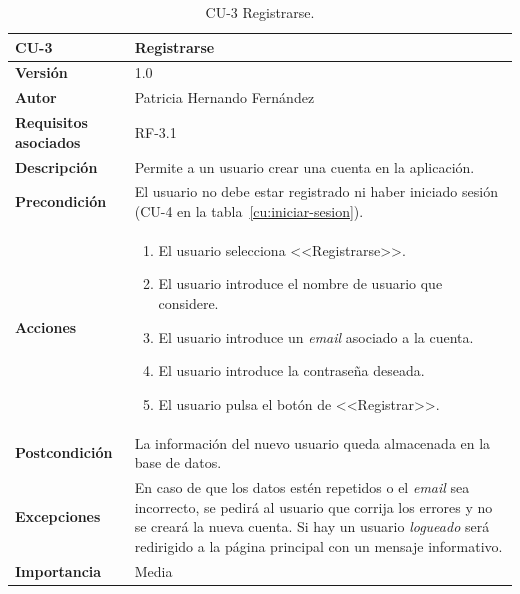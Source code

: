 \begin{table}[p]
	\centering
	\begin{tabularx}{\linewidth}{ p{} p{} }
		\toprule
		\textbf{CU-3}    & \textbf{Registrarse}\\
		\toprule
		\textbf{Versión}              & 1.0    \\
		\textbf{Autor}                & Patricia Hernando Fernández \\
		\textbf{Requisitos asociados} & RF-3.1 \\
		\textbf{Descripción}          & Permite a un usuario crear una cuenta en la aplicación.\\
		\textbf{Precondición}         & El usuario no debe estar registrado ni haber iniciado sesión (CU-4 en la tabla~\ref{cu:iniciar-sesion}). \\
		\textbf{Acciones}             &
		\begin{enumerate}
			\def\labelenumi{\arabic{enumi}.}
			\tightlist
			\item El usuario selecciona <<Registrarse>>.
			\item El usuario introduce el nombre de usuario que considere.
			\item El usuario introduce un \textit{email} asociado a la cuenta.
			\item El usuario introduce la contraseña deseada.
			\item El usuario pulsa el botón de <<Registrar>>.
		\end{enumerate}\\
		\textbf{Postcondición}        & La información del nuevo usuario queda almacenada en la base de datos. \\
		\textbf{Excepciones}          & En caso de que los datos estén repetidos o el \textit{email} sea incorrecto, se pedirá al usuario que corrija los errores y no se creará la nueva cuenta. Si hay un usuario \textit{logueado} será redirigido a la página principal con un mensaje informativo.\\
		\textbf{Importancia}          & Media \\
		\bottomrule
	\end{tabularx}
	\caption{CU-3 Registrarse.}
	\label{cu:registrarse}
\end{table}


